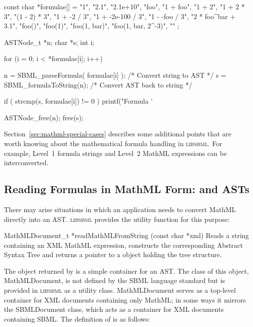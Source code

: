 \documentclass{sbmlmanual}
\newcommand{\libsbml}{\textsc{libsbml}}
\begin{document}
\begin{example}[c]
const char *formulae[] =
{
  "1",
  "2.1",
  "2.1e+10",
  "foo",
  "1 + foo",
  "1 + 2",
  "1 + 2 * 3",
  "(1 - 2) * 3",
  "1 + -2 / 3",
  "1 + -2e-100 / 3",
  "1 - -foo / 3",
  "2 * foo^bar + 3.1",
  "foo()",
  "foo(1)",
  "foo(1, bar)",
  "foo(1, bar, 2^-3)",
  ""
};

ASTNode_t *n;
char      *s;
int        i;

for (i = 0; i < *formulae[i]; i++)
{
  n = SBML_parseFormula( formulae[i] );  /* Convert string to AST */
  s = SBML_formulaToString(n);           /* Convert AST back to string */

  if ( strcmp(s, formulae[i]) != 0 ) 
  {
    printf("Formula '%
  }

  ASTNode_free(n);
  free(s);
}
\end{example}

Section~\ref{sec:mathml-special-cases} describes some additional points
that are worth knowing about the mathematical formula handling in
\libsbml{}.  For example,  Level~1 formula strings and Level~2 MathML
expressions can  be interconverted.


\subsection{Reading Formulas in MathML Form:  and ASTs}
\label{sec:mathml-math}

There may arise situations in which an application needs to convert MathML
directly into an AST.  \libsbml{} provides the utility function
 for this purpose:

\begin{methoddef}{MathMLDocument\_t *readMathMLFromString (const char *xml)}
  Reads a string containing an XML MathML expression, constructs the
  corresponding Abstract Syntax Tree and returns a pointer to a
   object holding the tree structure.
\end{methoddef}

The object returned by  is a simple
container for an AST.  The class of this object, MathMLDocument, is not
defined by the SBML language standard but is provided in \libsbml{} as a
utility class.  MathMLDocument serves as a top-level container for XML
documents containing only MathML; in some ways it mirrors the SBMLDocument
class, which acts as a container for XML documents containing SBML.  The
definition of  is as follows:
 
\end{document}
